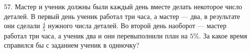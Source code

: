57. Мастер и ученик должны были каждый день вместе делать некоторое число деталей. В первый день ученик работал три часа, а мастер --- два, в результате они сделали $\frac{4}{5}$ нужного числа деталей. Во второй день наоборот --- мастер работал три часа, а ученик два и они перевыполнили план на $5\%.$ За какое время справился бы с заданием ученик в одиночку?\\

